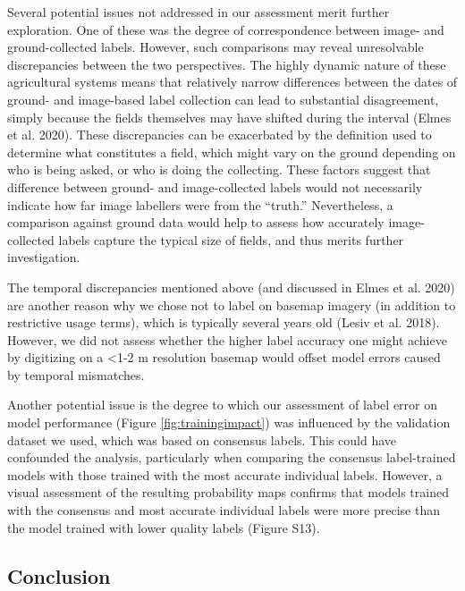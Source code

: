 \documentclass[11pt,a4paper]{article}
\begin{document}
Several potential issues not addressed in our assessment merit further
exploration. One of these was the degree of correspondence between
image- and ground-collected labels. However, such comparisons may reveal
unresolvable discrepancies between the two perspectives. The highly
dynamic nature of these agricultural systems means that relatively
narrow differences between the dates of ground- and image-based label
collection can lead to substantial disagreement, simply because the
fields themselves may have shifted during the interval (Elmes et al.
2020). These discrepancies can be exacerbated by the definition used to
determine what constitutes a field, which might vary on the ground
depending on who is being asked, or who is doing the collecting. These
factors suggest that difference between ground- and image-collected
labels would not necessarily indicate how far image labellers were from
the ``truth.'' Nevertheless, a comparison against ground data would help
to assess how accurately image-collected labels capture the typical size
of fields, and thus merits further investigation.

The temporal discrepancies mentioned above (and discussed in Elmes et
al. 2020) are another reason why we chose not to label on basemap
imagery (in addition to restrictive usage terms), which is typically
several years old (Lesiv et al. 2018). However, we did not assess
whether the higher label accuracy one might achieve by digitizing on a
\textless1-2 m resolution basemap would offset model errors caused by
temporal mismatches.

Another potential issue is the degree to which our assessment of label
error on model performance (Figure \ref{fig:trainingimpact}) was
influenced by the validation dataset we used, which was based on
consensus labels. This could have confounded the analysis, particularly
when comparing the consensus label-trained models with those trained
with the most accurate individual labels. However, a visual assessment
of the resulting probability maps confirms that models trained with the
consensus and most accurate individual labels were more precise than the
model trained with lower quality labels (Figure S13).

\hypertarget{conclusion}{%
\subsection{Conclusion}\label{conclusion}}
\end{document}

